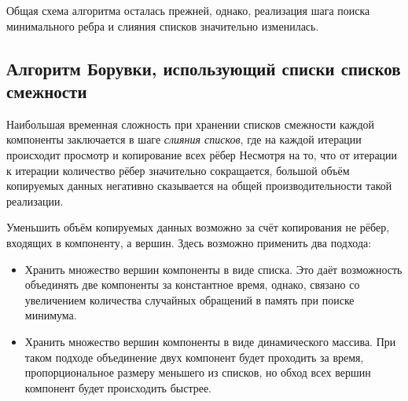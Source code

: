 \documentclass{article}
\begin{document}
Общая схема алгоритма осталась прежней, однако, реализация шага поиска минимального ребра и слияния списков значительно изменилась.


\subsection{Алгоритм Борувки, использующий списки списков смежности}

Наибольшая временная сложность при хранении списков смежности каждой компоненты заключается в шаге \textit{слияния списков}, где на каждой итерации происходит просмотр и копирование всех рёбер
Несмотря на то, что от итерации к итерации количество рёбер значительно сокращается, большой объём копируемых данных негативно сказывается на общей производительности такой реализации.

Уменьшить объём копируемых данных возможно за счёт копирования не рёбер, входящих в компоненту, а вершин. Здесь возможно применить два подхода:
\begin{itemize}
	\item Хранить множество вершин компоненты в виде списка. Это даёт возможность объединять две компоненты за константное время, однако, связано со увеличением количества случайных обращений в память при поиске минимума.
	\item Хранить множество вершин компоненты в виде динамического массива. При таком подходе объединение двух компонент будет проходить за время, пропорциональное размеру меньшего из списков, но обход всех вершин компонент будет происходить быстрее.
\end{itemize}
\end{document}
